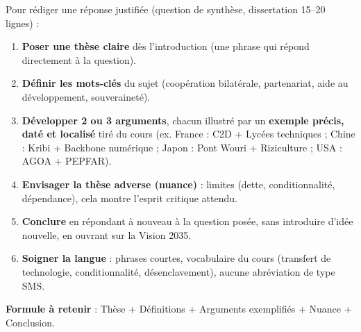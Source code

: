 \documentclass[11pt]{article}
\newcommand{\cle}[1]{{\popxbold\color{popdark}#1}}
\begin{document}
\begin{methode}
Pour rédiger une réponse justifiée (question de synthèse, dissertation 15--20 lignes) :
\begin{enumerate}
\item \textbf{Poser une thèse claire} dès l'introduction (une phrase qui répond directement à la question).
\item \textbf{Définir les mots-clés} du sujet (coopération bilatérale, partenariat, aide au développement, souveraineté).
\item \textbf{Développer 2 ou 3 arguments}, chacun illustré par un \textbf{exemple précis, daté et localisé} tiré du cours (ex. France : C2D + Lycées techniques ; Chine : Kribi + Backbone numérique ; Japon : Pont Wouri + Riziculture ; USA : AGOA + PEPFAR).
\item \textbf{Envisager la thèse adverse (nuance)} : limites (dette, conditionnalité, dépendance), cela montre l'esprit critique attendu.
\item \textbf{Conclure} en répondant à nouveau à la question posée, sans introduire d'idée nouvelle, en ouvrant sur la Vision 2035.
\item \textbf{Soigner la langue} : phrases courtes, vocabulaire du cours (\cle{transfert de technologie}, \cle{conditionnalité}, \cle{désenclavement}), aucune abréviation de type SMS.
\end{enumerate}
\textbf{Formule à retenir} : \cle{Thèse} + \cle{Définitions} + \cle{Arguments exemplifiés} + \cle{Nuance} + \cle{Conclusion}.
\end{methode}
\end{document}
